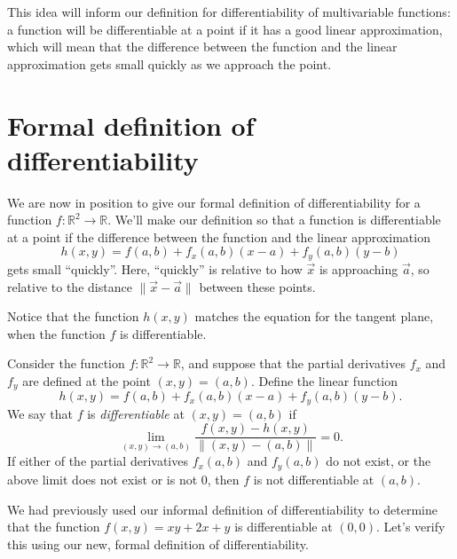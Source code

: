 \documentclass{ximera}
\begin{document}
This idea will inform our definition for differentiability of multivariable functions: a function will be differentiable at a point if it has a good linear approximation, which will mean that the difference between the function and the linear approximation gets small quickly as we approach the point.

\section*{Formal definition of differentiability}

We are now in position to give our formal definition of differentiability for a function $f:\mathbb{R}^2\rightarrow\mathbb{R}$. We'll make our definition so that a function is differentiable at a point if the difference between the function and the linear approximation
\[
h(x,y) = f(a,b) + f_x(a,b)(x-a)+f_y(a,b)(y-b)
\]
gets small ``quickly''. Here, ``quickly'' is relative to how $\vec{x}$ is approaching $\vec{a}$, so relative to the distance $\|\vec{x}-\vec{a}\|$ between these points.

Notice that the function $h(x,y)$ matches the equation for the tangent plane, when the function $f$ is differentiable.

\begin{definition}
Consider the function $f:\mathbb{R}^2\rightarrow\mathbb{R}$, and suppose that the partial derivatives $f_x$ and $f_y$ are defined at the point $(x,y)=(a,b)$. Define the linear function
\[
h(x,y) = f(a,b) + f_x(a,b)(x-a)+f_y(a,b)(y-b).
\]
We say that $f$ is \emph{differentiable} at $(x,y) = (a,b)$ if
\[
\lim_{(x,y)\rightarrow (a,b)}\frac{f(x,y) - h(x,y)}{\|(x,y)-(a,b)\|} = 0.
\]
If either of the partial derivatives $f_x(a,b)$ and $f_y(a,b)$ do not exist, or the above limit does not exist or is not $0$, then $f$ is not differentiable at $(a,b)$.
\end{definition}

We had previously used our informal definition of differentiability to determine that the function $f(x,y) = xy+2x+y$ is differentiable at $(0,0)$. Let's verify this using our new, formal definition of differentiability.
\end{document}

